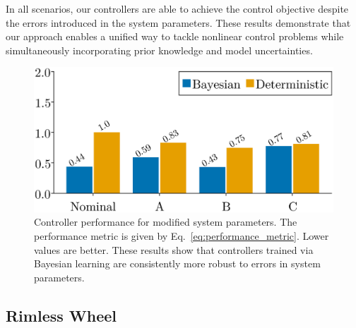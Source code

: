 In all scenarios, our controllers are able to achieve the control objective
despite the errors introduced in the system parameters.
%
%
These results demonstrate that our approach enables a unified way to tackle
nonlinear control problems while simultaneously incorporating prior knowledge
and model uncertainties.
%
\begin{figure}[H]
    \centering
    \includegraphics[width=0.7\linewidth]{./figures/pbc_bar.eps}
    \caption{
        Controller performance for modified system parameters. 
        The performance metric is given by
        Eq.~\eqref{eq:performance_metric}.
        Lower values are better. 
        These results show that controllers trained via Bayesian learning are
        consistently more robust to errors in system parameters.
    }
    \label{fig:neuralpbc_bar_plot}
\end{figure}

\subsection{Rimless Wheel}
\label{sssec:rimless_wheel_model}

